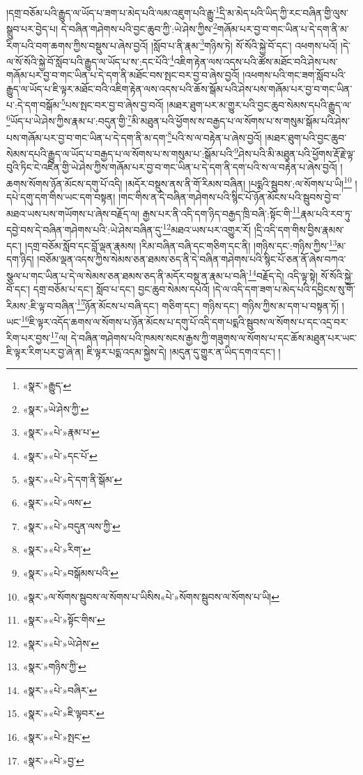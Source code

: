 །དགྲ་བཅོམ་པའི་རྒྱུད་ལ་ཡོད་པ་ཟག་པ་མེད་པའི་ལམ་འཇུག་པའི་རྒྱུ་\footnote{«སྣར་»རྒྱུད་}དྲི་མ་མེད་པའི་ཡིད་ཀྱི་རང་བཞིན་གྱི་ལུས་སྒྲུབ་པར་བྱེད་པ། དེ་བཞིན་གཤེགས་པའི་བྱང་ཆུབ་ཀྱི་:ཡེ་ཤེས་ཀྱིས་\footnote{«སྣར་»ཡེ་ཤེས་ཀྱི་}གཞོམ་པར་བྱ་བ་གང་ཡིན་པ་དེ་དག་ནི་མ་རིག་པའི་བག་ཆགས་ཀྱིས་བསྡུས་པ་ཞེས་བྱའོ། །སློབ་པ་ནི་རྣམ་\footnote{«སྣར་»«པེ་»རྣམ་པ་}གཉིས་ཏེ། སོ་སོའི་སྐྱེ་བོ་དང་། འཕགས་པའོ། །དེ་ལ་སོ་སོའི་སྐྱེ་བོ་སློབ་པའི་རྒྱུད་ལ་ཡོད་པ་ས་:དང་པོའི་\footnote{«སྣར་»«པེ་»དང་པོ་}འཇིག་རྟེན་ལས་འདས་པའི་ཚོས་མཐོང་བའི་ཤེས་པས་གཞོམ་པར་བྱ་བ་གང་ཡིན་པ་དེ་དག་ནི་མཐོང་བས་སྤང་བར་བྱ་བ་ཞེས་བྱའོ། །འཕགས་པའི་གང་ཟག་སློབ་པའི་རྒྱུད་ལ་ཡོད་པ་ཇི་ལྟར་མཐོང་བའི་འཇིག་རྟེན་ལས་འདས་པའི་ཆོས་སྒོམ་པའི་ཤེས་པས་གཞོམ་པར་བྱ་བ་གང་ཡིན་པ་:དེ་དག་བསྒོམ་\footnote{«སྣར་»«པེ་»དེ་དག་ནི་སྒོམ་}པས་སྤང་བར་བྱ་བ་ཞེས་བྱ་བའོ། །མཐར་ཐུག་པར་མ་གྱུར་པའི་བྱང་ཆུབ་སེམས་དཔའི་རྒྱུད་ལ་\footnote{«སྣར་»«པེ་»ལས་}ཡོད་པ་ཡེ་ཤེས་ཀྱིས་རྣམ་པ་:བདུན་གྱི་\footnote{«སྣར་»«པེ་»བདུན་ལས་ཀྱི་}མི་མཐུན་པའི་ཕྱོགས་ས་བརྒྱད་པ་ལ་སོགས་པ་ས་གསུམ་སྒོམ་པའི་ཤེས་པས་གཞོམ་པར་བྱ་བ་གང་ཡིན་པ་དེ་དག་ནི་མ་དག་\footnote{«སྣར་»«པེ་»རིག་}པའི་ས་ལ་བརྟེན་པ་ཞེས་བྱའོ། །མཐར་ཐུག་པའི་བྱང་ཆུབ་སེམས་དཔའི་རྒྱུད་ལ་ཡོད་པ་བརྒྱད་པ་ལ་སོགས་པ་ས་གསུམ་པ་:སྒོམ་པའི་\footnote{«སྣར་»«པེ་»བསྒོམས་པའི་}ཤེས་པའི་མི་མཐུན་པའི་ཕྱོགས་རྡོ་རྗེ་ལྟ་བུའི་ཏིང་ངེ་འཛིན་གྱི་ཡེ་ཤེས་ཀྱིས་གཞོམ་པར་བྱ་བ་གང་ཡིན་པ་དེ་དག་ནི་དག་པའི་ས་ལ་བརྟེན་པ་ཞེས་བྱའོ། །ཆགས་སོགས་ཉོན་མོངས་དགུ་པོ་འདི། །མདོར་བསྡུས་ནས་ནི་གོ་རིམས་བཞིན། །པདྨའི་སྦུབས་:ལ་སོགས་པ་ཡི།\footnote{«སྣར་»ལ་སོགས་སྦུབས་ལ་སོགས་པ་ཡིསིས«པེ་»སོགས་སྦུབས་ལ་སོགས་པ་ཡི།} །དཔེ་དགུ་དག་གིས་ཡང་དག་བསྟན། །གང་གིས་ན་དེ་བཞིན་གཤེགས་པའི་སྙིང་པོ་ཉོན་མོངས་པའི་སྦུབས་བྱེ་བ་མཐའ་ཡས་པས་གཡོགས་པ་ཞེས་བརྗོད་ལ། རྒྱས་པར་ནི་འདི་དག་ཉིད་བརྒྱད་ཁྲི་བཞི་:སྟོང་གི་\footnote{«སྣར་»«པེ་»སྟོང་གིས་}རྣམ་པའི་རབ་ཏུ་དབྱེ་བས་དེ་བཞིན་གཤེགས་པའི་:ཡེ་ཤེས་བཞིན་དུ་\footnote{«སྣར་»«པེ་»ཡེ་ཤེས་}མཐའ་ཡས་པར་འགྱུར་རོ། །དྲི་འདི་དག་གིས་བྱིས་རྣམས་དང་། །དགྲ་བཅོམ་སློབ་དང་བློ་ལྡན་རྣམས། །རིམ་བཞིན་བཞི་དང་གཅིག་དང་ནི། །གཉིས་དང་:གཉིས་ཀྱིས་\footnote{«སྣར་»གཉིས་ཀྱི་}མ་དག་ཉིད། །བཅོམ་ལྡན་འདས་ཀྱིས་སེམས་ཅན་ཐམས་ཅད་ནི་དེ་བཞིན་གཤེགས་པའི་སྙིང་པོ་ཅན་ནོ་ཞེས་བཀའ་སྩལ་པ་གང་ཡིན་པ་དེ་ལ་སེམས་ཅན་ཐམས་ཅད་ནི་མདོར་བསྡུ་ན་རྣམ་པ་བཞི་\footnote{«སྣར་»«པེ་»བཞིར་}བརྗོད་དེ། འདི་ལྟ་སྟེ། སོ་སོའི་སྐྱེ་བོ་དང་། དགྲ་བཅོམ་པ་དང་། སློབ་པ་དང་། བྱང་ཆུབ་སེམས་དཔའོ། །དེ་ལ་འདི་དག་ཟག་པ་མེད་པའི་དབྱིངས་སུ་གོ་རིམས་:ཇི་ལྟ་བ་བཞིན་\footnote{«སྣར་»«པེ་»ཇི་ལྟབར་}ཉོན་མོངས་པ་བཞི་དང་། གཅིག་དང་། གཉིས་དང་། གཉིས་ཀྱིས་མ་དག་པ་བསྟན་ཏོ། །ཡང་\footnote{«སྣར་»«པེ་»སྤང་}ཇི་ལྟར་འདོད་ཆགས་ལ་སོགས་པ་ཉོན་མོངས་པ་དགུ་པོ་འདི་དག་པདྨའི་སྦུབས་ལ་སོགས་པ་དང་འདྲ་བར་རིག་པར་བྱས་\footnote{«སྣར་»«པེ་»བྱ་}ལ། དེ་བཞིན་གཤེགས་པའི་ཁམས་སངས་རྒྱས་ཀྱི་གཟུགས་ལ་སོགས་པ་དང་ཆོས་མཐུན་པར་ཡང་ཇི་ལྟར་རིག་པར་བྱ་ཞེ་ན། ཇི་ལྟར་པདྨ་འདམ་སྐྱེས་དེ། །མདུན་དུ་གྱུར་ན་ཡིད་དགའ་དང་། །
